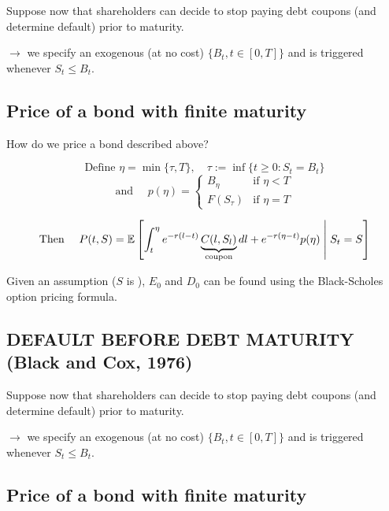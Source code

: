 Suppose now that shareholders can decide to stop paying debt coupons (and determine default) prior to maturity.

$\rightarrow$ we specify an exogenous  (at no cost) $\{B_t, t \in [0, T]\}$ and  is triggered whenever $S_t \leq B_t$.

\subsection*{\color{red}Price of a bond with finite maturity}

How do we price a bond described above?

\begin{equation*}
    \text{Define } \eta = \min \{\tau, T\}, \quad \tau := \inf \{t \geq 0 : S_t = B_t\}
\end{equation*}
\begin{equation*}
    \text{and } \quad p(\eta) = \begin{cases} B_\eta & \text{if } \eta < T \\ F(S_\tau) & \text{if } \eta = T \end{cases}
\end{equation*}

\begin{equation*}
    \text{Then } \quad P(t, S) = \mathbb E \left[ \int_t^\eta e^{-r(l-t)} \underbrace{C(l, S_l)}_{\text{coupon}} dl + e^{-r(\eta-t)} p(\eta) \;\middle|\; S_t = S \right]
\end{equation*}

Given an assumption ($S$ is ), $E_0$ and $D_0$ can be found using the Black-Scholes option pricing formula.

\subsection*{\color{red}DEFAULT BEFORE DEBT MATURITY (Black and Cox, 1976)}

Suppose now that shareholders can decide to stop paying debt coupons (and determine default) prior to maturity.

$\rightarrow$ we specify an exogenous  (at no cost) $\{B_t, t \in [0, T]\}$ and  is triggered whenever $S_t \leq B_t$.

\subsection*{\color{red}Price of a bond with finite maturity}

